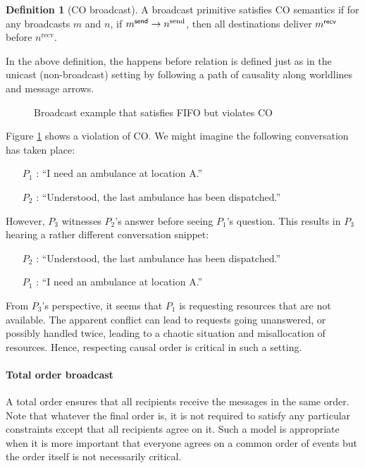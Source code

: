 \documentclass[]             %
{NASA}                       %
\theoremstyle{definition}
\newtheorem{definition}{Definition}[section]
\begin{document}
\begin{definition}[CO broadcast]
  \label{def:causalorder-bcast}
  A broadcast primitive satisfies CO semantics if for any broadcasts
  $m$ and $n$, if $m_{}^{\mathsf{send}} \to n^{\textrm{send}}$, then all
  destinations deliver $m_{}^{\mathsf{recv}}$ before $n^{\textrm{recv}}$.
\end{definition}
In the above definition, the happens before relation is defined just
as in the unicast (non-broadcast) setting by following a path of
causality along worldlines and message arrows.

\begin{figure}[p]
  \centering 
  \caption{Broadcast example that satisfies FIFO but violates CO}
  \label{fig:broadcast-fifo-1}
\end{figure}

Figure \ref{fig:broadcast-fifo-1} shows a violation of CO. We might
imagine the following conversation has taken place:
\begin{itemize}
\item [$P_1$]: ``I need an ambulance at location A.''
\item [$P_2$]: ``Understood, the last ambulance has been dispatched.''
\end{itemize}
However, $P_3$ witnesses $P_2$'s answer before seeing $P_1$'s
question. This results in $P_3$ hearing a rather different conversation snippet:
\begin{itemize}
\item [$P_2$]: ``Understood, the last ambulance has been dispatched.''
\item [$P_1$]: ``I need an ambulance at location A.''
\end{itemize}
From $P_3$'s perspective, it seems that $P_1$ is requesting resources
that are not available. The apparent conflict can lead to requests
going unanswered, or possibly handled twice, leading to a chaotic
situation and misallocation of resources. Hence, respecting causal
order is critical in such a setting.

\paragraph{Total order broadcast}
A total order ensures that all recipients receive the messages in the
same order. Note that whatever the final order is, it is not required
to satisfy any particular constraints except that all recipients agree
on it. Such a model is appropriate when it is more important that
everyone agrees on a common order of events but the order itself is
not necessarily critical.
\end{document}
